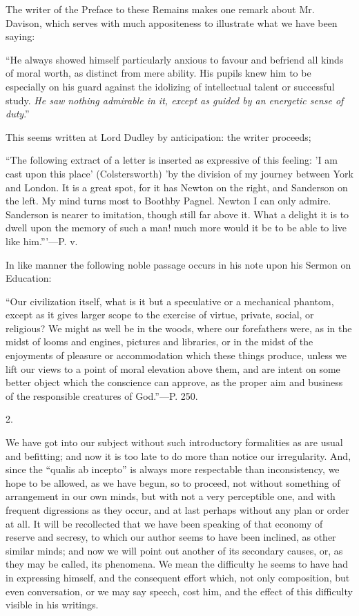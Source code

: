 The writer of the Preface to these Remains makes
one remark about Mr. Davison, which serves with much appositeness to
illustrate what we have been saying:

``He
always showed himself particularly anxious to favour and befriend all
kinds of moral worth, as distinct from mere ability. His pupils knew
him to be especially on his guard against the idolizing of
intellectual talent or successful study. \emph{He saw nothing admirable
in it, except as guided by an energetic sense of duty}.''

This seems written at Lord Dudley by
anticipation: the writer proceeds;

``The
following extract of a letter is inserted as expressive of this
feeling: 'I am cast upon this place' (Colstersworth) 'by the division
of my journey between York and London. It is a great spot, for it has
Newton on the right, and Sanderson on the left. My mind turns most to
Boothby Pagnel. Newton I can only admire. Sanderson is nearer to
imitation, though still far above it. What a delight it is to dwell
upon the memory of such a man! much more would it be to be able to
live like him.'''—P. v.

In like manner the following noble passage occurs
in his note upon his Sermon on Education:

``Our
civilization itself, what is it but a speculative or a mechanical
phantom, except as it gives larger scope to the exercise of virtue,
private, social, or religious? We might as well be in the woods, where
our forefathers were, as in the midst of looms and engines, pictures
and libraries, or in the midst of the enjoyments of pleasure or
accommodation which these things produce, unless we lift our views to
a point of moral elevation above them, and are intent on some better
object which the conscience can approve, as the proper aim and
business of the responsible creatures of God.''—P. 250.

2.

We have got into our subject without such
introductory formalities as are usual and befitting; and now it is too
late to do more than notice our irregularity. And, since the ``qualis
ab incepto'' is always more respectable than inconsistency, we hope to
be allowed, as we have begun, so to proceed, not without something of
arrangement in our own minds, but with not a very perceptible one, and
with frequent digressions as they occur, and at last perhaps without
any plan or order at all. It will be recollected that we have been
speaking of that economy of reserve and secresy, to which our author
seems to have been inclined, as other similar minds; and now we will
point out another of its secondary causes, or, as they may be called,
its phenomena. We mean the difficulty he seems to have had in
expressing himself, and the consequent effort which, not only
composition, but even conversation, or we may say speech, cost him,
and the effect of this difficulty visible in his writings.

